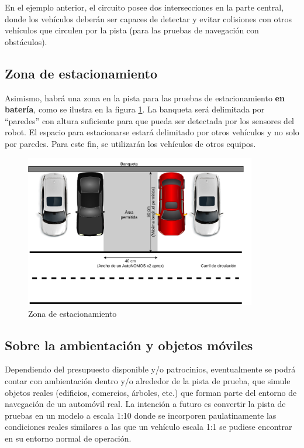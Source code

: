 \documentclass[letterpaper,12pt]{article}
\begin{document}
En el ejemplo anterior, el circuito posee dos intersecciones en la parte central, donde los vehículos deberán ser capaces de detectar y evitar colisiones con otros vehículos que circulen por la pista (para las pruebas de navegación con obstáculos). 

\subsection{Zona de estacionamiento}
Asimismo, habrá una zona en la pista para las pruebas de estacionamiento \textbf{en batería}, como se ilustra en la figura \ref{fig:Parking}. La banqueta será delimitada por “paredes” con altura suficiente para que pueda ser detectada por los sensores del robot. El espacio para estacionarse estará delimitado por otros vehículos y no solo por paredes. Para este fin, se utilizarán los vehículos de otros equipos.
\begin{figure}
  \centering
  \includegraphics[width=0.9\textwidth]{Figures/Parking.pdf}
  \caption{Zona de estacionamiento}
  \label{fig:Parking}
\end{figure}

\subsection{Sobre la ambientación y objetos móviles}
Dependiendo del presupuesto disponible y/o patrocinios, eventualmente se podrá contar con ambientación dentro y/o alrededor de la pista de prueba, que simule objetos reales (edificios, comercios, árboles, etc.) que forman parte del entorno de navegación de un automóvil real. La intención a futuro es convertir la pista de pruebas en un modelo a escala 1:10 donde se incorporen paulatinamente las condiciones reales similares a las que un vehículo escala 1:1 se pudiese encontrar en su entorno normal de operación.
\end{document}
